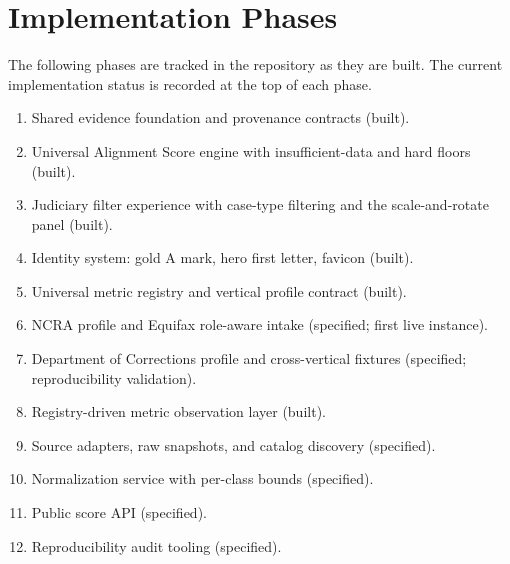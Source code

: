 \section{Implementation Phases}

The following phases are tracked in the repository as they are built. The
current implementation status is recorded at the top of each phase.

\begin{enumerate}
  \item Shared evidence foundation and provenance contracts (built).
  \item Universal Alignment Score engine with insufficient-data and hard
        floors (built).
  \item Judiciary filter experience with case-type filtering and the
        scale-and-rotate panel (built).
  \item Identity system: gold A mark, hero first letter, favicon (built).
  \item Universal metric registry and vertical profile contract (built).
  \item NCRA profile and Equifax role-aware intake (specified; first live
        instance).
  \item Department of Corrections profile and cross-vertical fixtures
        (specified; reproducibility validation).
  \item Registry-driven metric observation layer (built).
  \item Source adapters, raw snapshots, and catalog discovery (specified).
  \item Normalization service with per-class bounds (specified).
  \item Public score API (specified).
  \item Reproducibility audit tooling (specified).
\end{enumerate}
